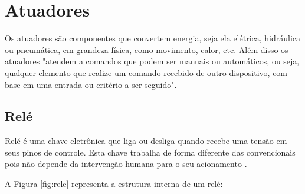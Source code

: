 
\section{Atuadores}

Os atuadores são componentes que convertem energia, seja ela elétrica, hidráulica ou pneumática, em grandeza física, como movimento, calor, etc. Além disso os atuadores "atendem a comandos que podem ser manuais ou automáticos, ou seja, qualquer elemento que realize um comando recebido de outro dispositivo, com base em uma entrada ou critério a ser seguido". \cite{brugnari2010automaccao}

\subsection{Relé}

Relé é uma chave eletrônica que liga ou desliga quando recebe uma tensão em seus pinos de controle. Esta chave trabalha de forma diferente das convencionais pois não depende da intervenção humana para o seu acionamento \cite[p.28]{ribeiro1999automaccao}.

A Figura \ref{fig:rele} representa a estrutura interna de um relé:

